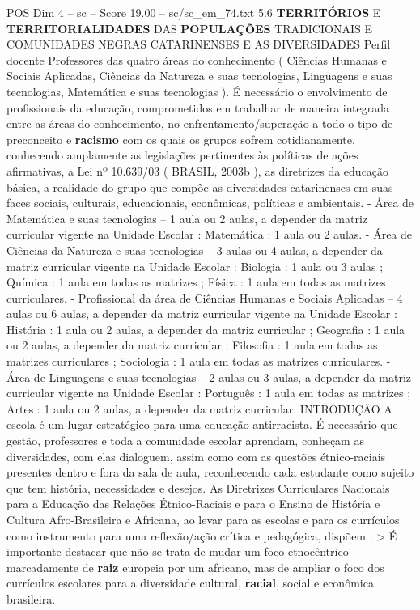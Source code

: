 \begin{textsample}{POS Dim 4 – sc – Score 19.00 – sc/sc\_em\_74.txt}  \label{ex:f4_pos_036}
5.6 \textbf{TERRITÓRIOS} E \textbf{TERRITORIALIDADES} DAS \textbf{POPULAÇÕES} TRADICIONAIS E COMUNIDADES NEGRAS CATARINENSES E AS DIVERSIDADES Perfil docente Professores das quatro áreas do conhecimento ( Ciências Humanas e Sociais Aplicadas, Ciências da Natureza e suas tecnologias, Linguagens e suas tecnologias, Matemática e suas tecnologias ).
É necessário o envolvimento de profissionais da educação, comprometidos em trabalhar de maneira integrada entre as áreas do conhecimento, no enfrentamento/superação a todo o tipo de preconceito e \textbf{racismo} com os quais os grupos sofrem cotidianamente, conhecendo amplamente as legislações pertinentes às políticas de ações afirmativas, a Lei nº 10.639/03 ( BRASIL, 2003b ), as diretrizes da educação básica, a realidade do grupo que compõe as diversidades catarinenses em suas faces sociais, culturais, educacionais, econômicas, políticas e ambientais. - Área de Matemática e suas tecnologias – 1 aula ou 2 aulas, a depender da matriz curricular vigente na Unidade Escolar : Matemática : 1 aula ou 2 aulas. - Área de Ciências da Natureza e suas tecnologias – 3 aulas ou 4 aulas, a depender da matriz curricular vigente na Unidade Escolar : Biologia : 1 aula ou 3 aulas ; Química : 1 aula em todas as matrizes ; Física : 1 aula em todas as matrizes curriculares. - Profissional da área de Ciências Humanas e Sociais Aplicadas – 4 aulas ou 6 aulas, a depender da matriz curricular vigente na Unidade Escolar : História : 1 aula ou 2 aulas, a depender da matriz curricular ; Geografia : 1 aula ou 2 aulas, a depender da matriz curricular ; Filosofia : 1 aula em todas as matrizes curriculares ; Sociologia : 1 aula em todas as matrizes curriculares. - Área de Linguagens e suas tecnologias – 2 aulas ou 3 aulas, a depender da matriz curricular vigente na Unidade Escolar : Português : 1 aula em todas as matrizes ; Artes : 1 aula ou 2 aulas, a depender da matriz curricular.
INTRODUÇÃO A escola é um lugar estratégico para uma educação antirracista.
É necessário que gestão, professores e toda a comunidade escolar aprendam, conheçam as diversidades, com elas dialoguem, assim como com as questões étnico-raciais presentes dentro e fora da sala de aula, reconhecendo cada estudante como sujeito que tem história, necessidades e desejos.
As Diretrizes Curriculares Nacionais para a Educação das Relações Étnico-Raciais e para o Ensino de História e Cultura Afro-Brasileira e Africana, ao levar para as escolas e para os currículos como instrumento para uma reflexão/ação crítica e pedagógica, dispõem : > É importante destacar que não se trata de mudar um foco etnocêntrico marcadamente de \textbf{raiz} europeia por um africano, mas de ampliar o foco dos currículos escolares para a diversidade cultural, \textbf{racial}, social e econômica brasileira.

\end{textsample}
